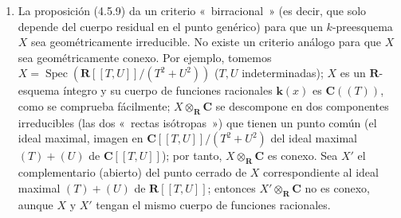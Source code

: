 \begin{remarks}[4.5.12]
\begin{enumerate}
\item[(ii)] La proposición (4.5.9) da un criterio «~birracional~» (es decir,
que solo depende del cuerpo residual en el punto genérico) para que un
$k$-preesquema $X$ sea geométricamente irreducible. No existe un criterio
análogo para que $X$ sea geométricamente conexo. Por ejemplo, tomemos
$X=\operatorname{Spec}(\mathbf R[[T,U]]/(T^2+U^2))$ ($T,U$ indeterminadas);
$X$ es un $\mathbf R$-esquema íntegro y su cuerpo de funciones racionales
$\boldsymbol{k}(x)$ es $\mathbf C((T))$, como se comprueba fácilmente;
$X\otimes_{\mathbf
R}\mathbf C$ se descompone en dos componentes irreducibles
(las dos «~rectas isótropas~») que tienen un punto común (el ideal maximal,
imagen en $\mathbf C[[T,U]]/(T^2+U^2)$ del ideal maximal $(T)+(U)$ de
$\mathbf C[[T,U]]$); por tanto, $X\otimes_{\mathbf R}\mathbf C$ es conexo.
Sea $X'$ el complementario (abierto) del punto cerrado de $X$ correspondiente
al ideal maximal $(T)+(U)$ de $\mathbf R[[T,U]]$; entonces
$X'\otimes_{\mathbf R}\mathbf C$ no es conexo, aunque $X$ y $X'$ tengan el
mismo cuerpo de funciones racionales.
\end{enumerate}
\end{remarks}
